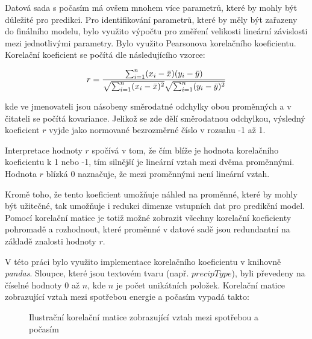 \documentclass[FM,BP,fonts]{tulthesis}
\begin{document}
Datová sada s počasím má ovšem mnohem více parametrů, které by mohly být důležité pro predikci. Pro identifikování parametrů, které by měly být zařazeny do finálního modelu, bylo využito výpočtu pro změření velikosti lineární závislosti mezi jednotlivými parametry. Bylo využito Pearsonova korelačního koeficientu. Korelační koeficient se počítá dle následujícího vzorce: 

\begin{equation}
	r =
	\frac{ \sum_{i=1}^{n}(x_i-\bar{x})(y_i-\bar{y}) }{%
		\sqrt{\sum_{i=1}^{n}(x_i-\bar{x})^2}\sqrt{\sum_{i=1}^{n}(y_i-\bar{y})^2}}
\end{equation}

kde ve jmenovateli jsou násobeny směrodatné odchylky obou proměnných a v čitateli se počítá kovariance. Jelikož se zde dělí směrodatnou odchylkou, výsledný koeficient $r$ vyjde jako normované bezrozměrné číslo v rozsahu -1 až 1.

Interpretace hodnoty $r$ spočívá v tom, že čím blíže je hodnota korelačního koeficientu k 1 nebo -1, tím silnější je lineární vztah mezi dvěma proměnnými. Hodnota $r$ blízká 0 naznačuje, že mezi proměnnými není lineární vztah.

Kromě toho, že tento koeficient umožňuje náhled na proměnné, které by mohly být užitečné, tak umožňuje i redukci dimenze vstupních dat pro predikční model. Pomocí korelační matice je totiž možné zobrazit všechny korelační koeficienty pohromadě a rozhodnout, které proměnné v datové sadě jsou redundantní na základě znalosti hodnoty $r$.

V této práci bylo využito implementace korelačního koeficientu v knihovně \textit{pandas}. Sloupce, které jsou textovém tvaru (např. $precipType$), byli převedeny na číselné hodnoty 0 až $n$, kde $n$ je počet unikátních položek. Korelační matice zobrazující vztah mezi spotřebou energie a počasím vypadá takto:

\begin{figure}[htbp]
	\centering
	\caption{Ilustrační korelační matice zobrazující vztah mezi spotřebou a počasím}
	\label{fig:year_avg_all}
\end{figure}
\end{document}
